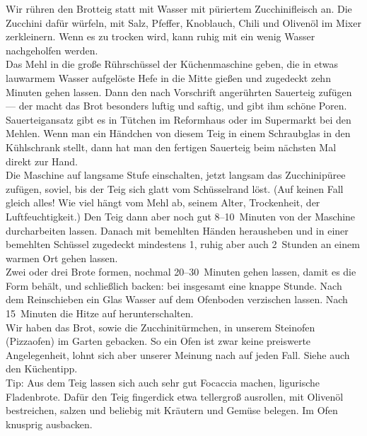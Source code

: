       \begin{zubereitung}
        Wir rühren den Brotteig statt mit Wasser mit püriertem Zucchinifleisch
	an. Die Zucchini dafür würfeln, mit Salz, Pfeffer, Knoblauch, Chili und
	Olivenöl im Mixer zerkleinern. Wenn es zu trocken wird, kann ruhig mit
	ein wenig Wasser nachgeholfen werden. \\
        Das Mehl in die große Rührschüssel der Küchenmaschine geben, die in
	etwas lauwarmem Wasser aufgelöste Hefe in die Mitte gießen und
	zugedeckt zehn Minuten gehen lassen. Dann den nach Vorschrift
	angerührten Sauerteig zufügen --- der macht das Brot besonders luftig
	und saftig, und gibt ihm schöne Poren. \\
        Sauerteigansatz gibt es in Tütchen im Reformhaus oder im Supermarkt bei
	den Mehlen. Wenn man ein Händchen von diesem Teig in einem Schraubglas
	in den Kühlschrank stellt, dann hat man den fertigen Sauerteig beim
	nächsten Mal direkt zur Hand. \\
        Die Maschine auf langsame Stufe einschalten, jetzt langsam das
	Zucchinipüree zufügen, soviel, bis der Teig sich glatt vom Schüsselrand
	löst. (Auf keinen Fall gleich alles! Wie viel hängt vom Mehl ab, seinem
	Alter, Trockenheit, der Luftfeuchtigkeit.) Den Teig dann aber noch gut
	8--10~Minuten von der Maschine durcharbeiten lassen. Danach mit
	bemehlten Händen herausheben und in einer bemehlten Schüssel zugedeckt
	mindestens 1, ruhig aber auch 2~Stunden an einem warmen Ort gehen
	lassen. \\
        Zwei oder drei Brote formen, nochmal 20--30~Minuten gehen lassen, damit
	es die Form behält, und schließlich backen: bei  insgesamt
	eine knappe Stunde. Nach dem Reinschieben ein Glas Wasser auf dem
	Ofenboden verzischen lassen. Nach 15~Minuten die Hitze auf 
	herunterschalten. \\
        Wir haben das Brot, sowie die Zucchinitürmchen, in unserem Steinofen
	(Pizzaofen) im Garten gebacken. So ein Ofen ist zwar keine preiswerte
	Angelegenheit, lohnt sich aber unserer Meinung nach auf jeden Fall.
	Siehe auch den Küchentipp. \\
        Tip: Aus dem Teig lassen sich auch sehr gut Focaccia machen,
	ligurische Fladenbrote. Dafür den Teig fingerdick etwa tellergroß
	ausrollen, mit Olivenöl bestreichen, salzen und beliebig mit Kräutern
	und Gemüse belegen. Im Ofen knusprig ausbacken. \\
      \end{zubereitung}

